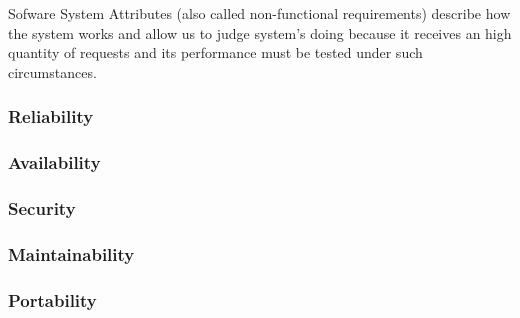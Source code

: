 Sofware System Attributes (also called non-functional requirements) describe how the system works and allow us to judge system's doing because it receives an high quantity of requests and its performance must be tested under such circumstances.

\subsubsection{Reliability}
 
\subsubsection{Availability}

\subsubsection{Security}

\subsubsection{Maintainability}

\subsubsection{Portability}
